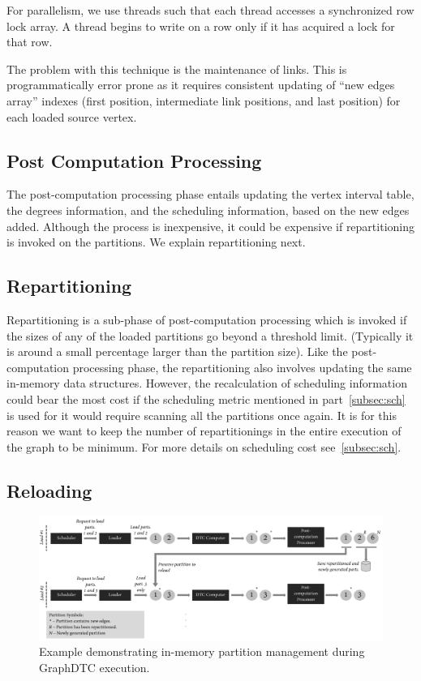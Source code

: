 \documentclass[10pt,preprint]{sigplanconf}
\begin{document}
For parallelism, we use threads such that each thread accesses a synchronized row lock array. A thread begins to write on a row only if it has acquired a lock for that row. 

The problem with this technique is the maintenance of links. This is programmatically error prone as it requires consistent updating of ``new edges array'' indexes (first position, intermediate link positions, and last position) for each loaded source vertex. 

\subsection{Post Computation Processing}
\label{subsec:pcp}

The post-computation processing phase entails updating the vertex interval table, the degrees information, and the scheduling information, based on the new edges added. Although the process is inexpensive, it could be expensive if repartitioning is invoked on the partitions. We explain repartitioning next.

\subsection{Repartitioning}
\label{subsec:rprt}
Repartitioning is a sub-phase of post-computation processing which is invoked if the sizes of any of the loaded partitions go beyond a threshold limit. (Typically it is around a small percentage larger than the partition size). Like the post-computation processing phase, the repartitioning also involves updating the same in-memory data structures. However, the recalculation of scheduling information could bear the most cost if the scheduling metric mentioned in part~\ref{subsec:sch} is used for it would require scanning all the partitions once again. It is for this reason we want to keep the number of repartitionings in the entire execution of the graph to be minimum. For more details on scheduling cost see~\ref{subsec:sch}.

\subsection{Reloading}
\label{subsec:rld}

\begin{figure}[!htbp]
	\begin{center}
		\includegraphics[scale=0.45]{Figures/partmgtdemo.pdf}
	\end{center}
	\caption{Example demonstrating in-memory partition management during GraphDTC execution.}
	\label{fig-partmgtdemo}
\end{figure}
\end{document}
